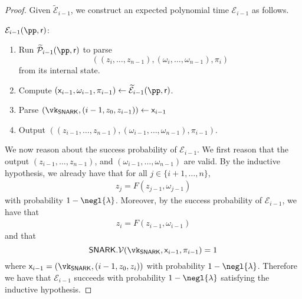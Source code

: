 \begin{proof}
   Given $\widetilde{\mathcal{E}}_{i - 1}$, 
   we construct an expected polynomial time $\mathcal{E}_{i - 1}$ as follows.
 
 
   \begin{mdframed}[nobreak=true]
   \noindent \underline{$\mathcal{E}_{i - 1}(\pp, \mathsf{r})$}: 
   \begin{enumerate}
     \item Run $\widetilde{\Po}_{i - 1}(\pp, \mathsf{r})$
     to parse
     \[
     ((z_i, \ldots, z_{n - 1}), (\omega_i, \ldots, \omega_{n -
     1}), \pi_i)
     \]
     from its internal state.
     \item Compute $(\io_{i - 1}, \omega_{i - 1}, \pi_{i - 1}) \gets \widetilde{\mathcal{E}}_{i - 1}(\pp, \mathsf{r})$.
     \item Parse $(\vk_\snark, (i - 1, z_0, z_{i - 1})) \gets \io_{i - 1}$
     \item Output $((z_{i - 1}, \ldots, z_{n - 1}), (\omega_{i - 1}, \ldots, \omega_{n - 1}), \pi_{i - 1})$. 
   \end{enumerate}
 \end{mdframed}
 
  We now reason about the success probability of $\mathcal{E}_{i - 1}$.
   We first reason that the output $(z_{i - 1}, \ldots, z_{n - 1})$, and
   $(\omega_{i - 1}, \ldots, \omega_{n - 1})$ are valid.
   By the inductive hypothesis, 
   we already have that for all $j \in \{i + 1, \ldots, n\}$,
   \begin{align*}
     z_j = F(z_{j - 1}, \omega_{j - 1})
   \end{align*}
   with probability $1 - \negl{\lambda}$.
   Moreover,
   by the success probability of $\mathcal{E}_{i - 1}$,
   we have that
   \begin{align*}
     z_{i} = F(z_{i - 1}, \omega_{i - 1})
   \end{align*}
   and that
   \[
   \snark.\V(\vk_\snark, \io_{i - 1}, \pi_{i - 1}) = 1
   \]
   where $\io_{i - 1} = (\vk_\snark, (i - 1, z_0, z_i))$
   with probability $1 - \negl{\lambda}$.
   Therefore we have that $\mathcal{E}_{i - 1}$
   succeeds with probability $1 - \negl{\lambda}$
   satisfying the inductive hypothesis.
 \end{proof} 
